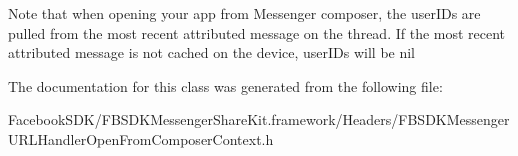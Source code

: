 Note that when opening your app from Messenger composer, the user\-I\-Ds are pulled from the most recent attributed message on the thread. If the most recent attributed message is not cached on the device, user\-I\-Ds will be nil 

The documentation for this class was generated from the following file\-:\begin{DoxyCompactItemize}
\item 
Facebook\-S\-D\-K/\-F\-B\-S\-D\-K\-Messenger\-Share\-Kit.\-framework/\-Headers/F\-B\-S\-D\-K\-Messenger\-U\-R\-L\-Handler\-Open\-From\-Composer\-Context.\-h\end{DoxyCompactItemize}
